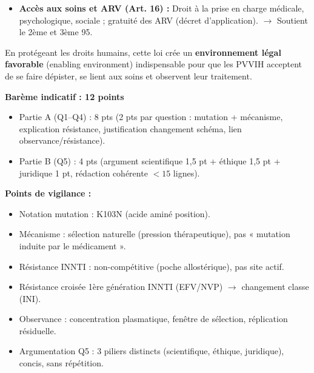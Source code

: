 \documentclass[11pt]{article}
\begin{document}
\begin{corrige}
\begin{enumerate}
\begin{itemize}
\item \textbf{Accès aux soins et ARV (Art. 16) :} Droit à la prise en charge médicale, psychologique, sociale ; gratuité des ARV (décret d'application). $\to$ Soutient le 2ème et 3ème 95.
\end{itemize}
En protégeant les droits humains, cette loi crée un \textbf{environnement légal favorable} (enabling environment) indispensable pour que les PVVIH acceptent de se faire dépister, se lient aux soins et observent leur traitement.
\end{enumerate}
\end{corrige}

\begin{corrige}
\textbf{Barème indicatif : 12 points}
\begin{itemize}
\item Partie A (Q1--Q4) : 8 pts (2 pts par question : mutation + mécanisme, explication résistance, justification changement schéma, lien observance/résistance).
\item Partie B (Q5) : 4 pts (argument scientifique 1,5 pt + éthique 1,5 pt + juridique 1 pt, rédaction cohérente $< 15$ lignes).
\end{itemize}

\textbf{Points de vigilance :}
\begin{itemize}
\item Notation mutation : K103N (acide aminé position).
\item Mécanisme : sélection naturelle (pression thérapeutique), pas « mutation induite par le médicament ».
\item Résistance INNTI : non-compétitive (poche allostérique), pas site actif.
\item Résistance croisée 1ère génération INNTI (EFV/NVP) $\to$ changement classe (INI).
\item Observance : concentration plasmatique, fenêtre de sélection, réplication résiduelle.
\item Argumentation Q5 : 3 piliers distincts (scientifique, éthique, juridique), concis, sans répétition.
\end{itemize}


\end{corrige}
\end{document}
